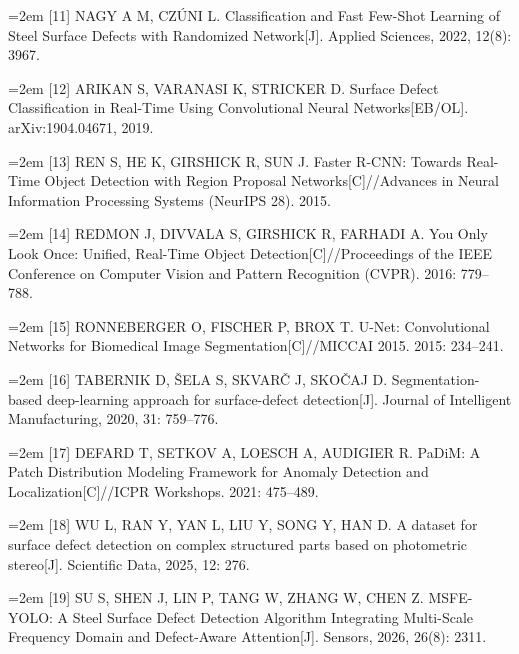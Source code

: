 {\small\noindent\hangindent=2em \hypertarget{ref:11}{}[11] NAGY A M, CZÚNI L. Classification and Fast Few-Shot Learning of Steel Surface Defects with Randomized Network[J]. Applied Sciences, 2022, 12(8): 3967.\par}

{\small\noindent\hangindent=2em \hypertarget{ref:12}{}[12] ARIKAN S, VARANASI K, STRICKER D. Surface Defect Classification in Real-Time Using Convolutional Neural Networks[EB/OL]. arXiv:1904.04671, 2019.\par}

{\small\noindent\hangindent=2em \hypertarget{ref:13}{}[13] REN S, HE K, GIRSHICK R, SUN J. Faster R-CNN: Towards Real-Time Object Detection with Region Proposal Networks[C]//Advances in Neural Information Processing Systems (NeurIPS 28). 2015.\par}

{\small\noindent\hangindent=2em \hypertarget{ref:14}{}[14] REDMON J, DIVVALA S, GIRSHICK R, FARHADI A. You Only Look Once: Unified, Real-Time Object Detection[C]//Proceedings of the IEEE Conference on Computer Vision and Pattern Recognition (CVPR). 2016: 779–788.\par}

{\small\noindent\hangindent=2em \hypertarget{ref:15}{}[15] RONNEBERGER O, FISCHER P, BROX T. U-Net: Convolutional Networks for Biomedical Image Segmentation[C]//MICCAI 2015. 2015: 234–241.\par}

{\small\noindent\hangindent=2em \hypertarget{ref:16}{}[16] TABERNIK D, ŠELA S, SKVARČ J, SKOČAJ D. Segmentation-based deep-learning approach for surface-defect detection[J]. Journal of Intelligent Manufacturing, 2020, 31: 759–776.\par}

{\small\noindent\hangindent=2em \hypertarget{ref:17}{}[17] DEFARD T, SETKOV A, LOESCH A, AUDIGIER R. PaDiM: A Patch Distribution Modeling Framework for Anomaly Detection and Localization[C]//ICPR Workshops. 2021: 475–489.\par}

{\small\noindent\hangindent=2em \hypertarget{ref:18}{}[18] WU L, RAN Y, YAN L, LIU Y, SONG Y, HAN D. A dataset for surface defect detection on complex structured parts based on photometric stereo[J]. Scientific Data, 2025, 12: 276.\par}

{\small\noindent\hangindent=2em \hypertarget{ref:19}{}[19] SU S, SHEN J, LIN P, TANG W, ZHANG W, CHEN Z. MSFE-YOLO: A Steel Surface Defect Detection Algorithm Integrating Multi-Scale Frequency Domain and Defect-Aware Attention[J]. Sensors, 2026, 26(8): 2311.\par}

